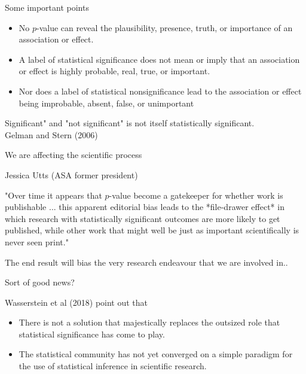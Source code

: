 \documentclass{beamer}
\begin{document}
\begin{frame}{Some important points}

\begin{itemize}
	\item No $p$-value can reveal the plausibility, presence,
	truth, or importance of an association or effect. 
	\item  A label of statistical significance does not mean or imply that an
	association or effect is highly probable, real, true, or important.
	\item Nor does a label of statistical nonsignificance lead to the association
	or effect being improbable, absent, false, or unimportant
\end{itemize}

\begin{displayquote}
	Significant" and "not significant" is not itself statistically significant.\\
	
	Gelman and Stern (2006)

\end{displayquote}


\end{frame}

\begin{frame}{We are affecting the scientific process}

Jessica Utts (ASA former president)

"Over time it appears that $p$-value become a gatekeeper for whether work is publishable ... this apparent editorial bias leads to the *file-drawer effect* in which research with statistically significant outcomes are more likely to get published, while other work that might well be just as important scientifically is never seen print."

The end result will bias the very research endeavour that we are involved in..

\end{frame}

\begin{frame}{Sort of good news?}

Wasserstein et al (2018) point out that 

\begin{itemize}
	\item There is not a solution that majestically replaces the outsized role that statistical significance has come to play.
	\item The statistical community has not yet converged on a simple paradigm for the use of statistical inference in scientific research.
\end{itemize}

\end{frame}
\end{document}
